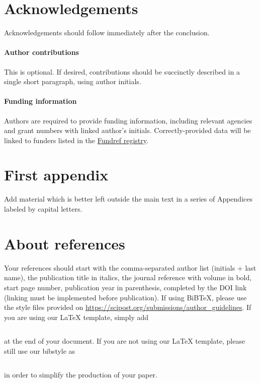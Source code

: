 \documentclass{SciPost}
\begin{document}
\section*{Acknowledgements}
Acknowledgements should follow immediately after the conclusion.

\paragraph{Author contributions}
This is optional. If desired, contributions should be succinctly described in a single short paragraph, using author initials.

\paragraph{Funding information}
Authors are required to provide funding information, including relevant agencies and grant numbers with linked author's initials. Correctly-provided data will be linked to funders listed in the \href{https://www.crossref.org/services/funder-registry/}{\sf Fundref registry}.


\begin{appendix}

\section{First appendix}
Add material which is better left outside the main text in a series of Appendices labeled by capital letters.

\section{About references}
Your references should start with the comma-separated author list (initials + last name), the publication title in italics, the journal reference with volume in bold, start page number, publication year in parenthesis, completed by the DOI link (linking must be implemented before publication). If using BiBTeX, please use the style files provided  on \url{https://scipost.org/submissions/author_guidelines}. If you are using our LaTeX template, simply add
\begin{verbatim}

\end{verbatim}
at the end of your document. If you are not using our LaTeX template, please still use our bibstyle as
\begin{verbatim}

\end{verbatim}
in order to simplify the production of your paper.
\end{appendix}
\end{document}
